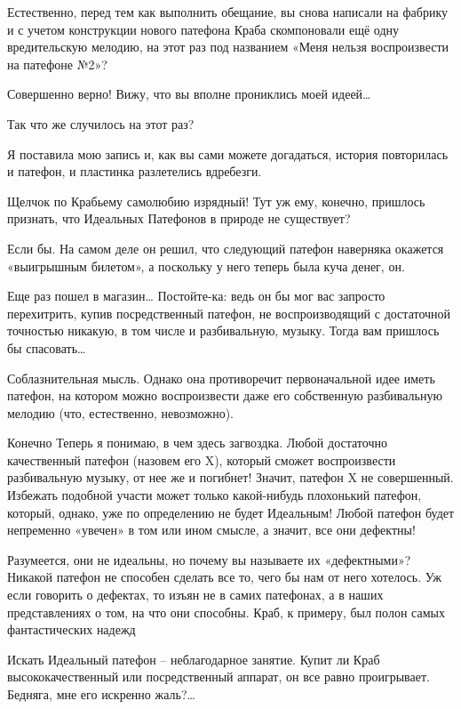 \documentclass[../main.tex]{subfiles}
\begin{document}
\begin{dialogue}
 Естественно, перед тем как выполнить обещание, вы снова написали на фабрику и с учетом конструкции нового патефона Краба скомпоновали ещё одну вредительскую мелодию, на этот раз под названием «Меня нельзя воспроизвести на патефоне №2»?

 Совершенно верно! Вижу, что вы вполне прониклись моей идеей\ldots{}

 Так что же случилось на этот раз?

 Я поставила мою запись и, как вы сами можете догадаться, история повторилась и патефон, и пластинка разлетелись вдребезги.

 Щелчок по Крабьему самолюбию изрядный! Тут уж ему, конечно, пришлось признать, что Идеальных Патефонов в природе не существует?

 Если бы. На самом деле он решил, что следующий патефон наверняка окажется «выигрышным билетом», а поскольку у него теперь была куча денег, он.

 Еще раз пошел в магазин\ldots{} Постойте-ка: ведь он бы мог вас запросто перехитрить, купив посредственный патефон, не воспроизводящий с достаточной точностью никакую, в том числе и разбивальную, музыку. Тогда вам пришлось бы спасовать\ldots{}

 Соблазнительная мысль. Однако она противоречит первоначальной идее иметь патефон, на котором можно воспроизвести даже его собственную разбивальную мелодию (что, естественно, невозможно).

 Конечно Теперь я понимаю, в чем здесь загвоздка. Любой достаточно качественный патефон (назовем его X), который сможет воспроизвести разбивальную музыку, от нее же и погибнет! Значит, патефон X не совершенный. Избежать подобной участи может только какой-нибудь плохонький патефон, который, однако, уже по определению не будет Идеальным! Любой патефон будет непременно «увечен» в том или ином смысле, а значит, все они дефектны!

 Разумеется, они не идеальны, но почему вы называете их «дефектными»? Никакой патефон не способен сделать все то, чего бы нам от него хотелось. Уж если говорить о дефектах, то изъян не в самих патефонах, а в наших представлениях о том, на что они способны. Краб, к примеру, был полон самых фантастических надежд

 Искать Идеальный патефон \--- неблагодарное занятие. Купит ли Краб высококачественный или посредственный аппарат, он все равно проигрывает. Бедняга, мне его искренно жаль?\ldots{}


\end{dialogue}
\end{document}
